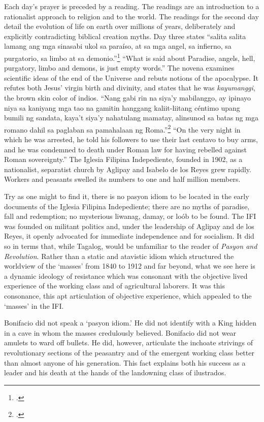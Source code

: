 Each day's prayer is preceded by a reading. The readings are an introduction to a rationalist approach to religion and to the world. The readings for the second day detail the evolution of life on earth over millions of years, deliberately and explicitly contradicting biblical creation myths. Day three states \enquote{salita salita lamang ang mga sinasabi ukol sa para\'iso, at sa mga angel, sa infierno, sa purgatorio, sa limbo at sa demonio.}\footcite[21]{AglipayYLabayan1925} \enquote{What is said about Paradise, angels, hell, purgatory, limbo and demons, is just empty words.} The novena examines scientific ideas of the end of the Universe and rebuts notions of the apocalypse. It refutes both Jesus' virgin birth and divinity, and states that he was \textit{kayumanggi}, the brown skin color of indios. \enquote{Nang gabi rin na siya'y mabilanggo, ay ipinayo niya sa kaniyang mga tao na gamitin hanggang kaliit-liitang c\'entimo upang bumili ng sandata, kaya't siya'y nahatulang mamatay, alinsunod sa batas ng mga romano dahil sa paglaban sa pamahalaan ng Roma.}\footcite[35]{AglipayYLabayan1925} \enquote{On the very night in which he was arrested, he told his followers to use their last centavo to buy arms, and he was condemned to death under Roman law for having rebelled against Roman sovereignty.} The Iglesia Filipina Indepediente, founded in 1902, as a nationalist, separatist church by Aglipay and Isabelo de los Reyes grew rapidly. Workers and peasants swelled its numbers to one and half million members. 

Try as one might to find it, there is no pasyon idiom to be located in the early documents of the Iglesia Filipina Indepediente; there are no myths of paradise, fall and redemption; no mysterious liwanag, damay, or lo\'ob to be found. The IFI was founded on militant politics and, under the leadership of Aglipay and de los Reyes, it openly advocated for immediate independence and for socialism. It did so in terms that, while Tagalog, would be unfamiliar to the reader of \textit{Pasyon and Revolution}. Rather than a static and atavistic idiom which structured the worldview of the \enquote*{masses} from 1840 to 1912 and far beyond, what we see here is a dynamic ideology of resistance which was consonant with the objective lived experience of the working class and of agricultural laborers. It was this consonance, this apt articulation of objective experience, which appealed to the \enquote*{masses} in the IFI.

Bonifacio did not speak a \enquote*{pasyon idiom.} He did not identify with a King hidden in a cave in whom the masses credulously believed. Bonifacio did not wear amulets to ward off bullets. He did, however, articulate the inchoate strivings of revolutionary sections of the peasantry and of the emergent working class better than almost anyone of his generation. This fact explains both his success as a leader and his death at the hands of the landowning class of ilustrados.
